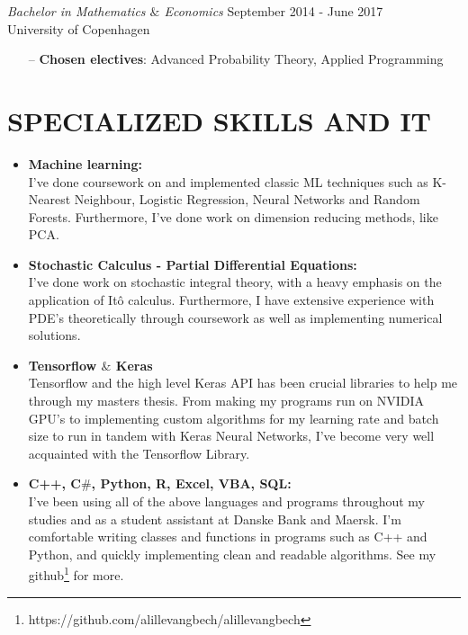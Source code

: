 \documentclass[margin, 10pt]{res} %
\begin{document}
\begin{resume}
{\sl Bachelor in Mathematics $\&$ Economics}  \hfill September 2014 - June 2017 \\
University of Copenhagen
\begin{itemize}
\item[--] \textbf{Chosen electives}: Advanced Probability Theory, Applied Programming
\end{itemize}


 

\section{SPECIALIZED SKILLS AND IT} 
\begin{itemize}
 \item \textbf{Machine learning:} \\
I've done coursework on and implemented classic ML techniques such as K-Nearest Neighbour, Logistic Regression, Neural Networks and Random Forests. Furthermore, I've done work on dimension reducing methods, like PCA.
 \item \textbf{{}Stochastic Calculus - Partial Differential Equations:} \\
 I've done work on stochastic integral theory, with a heavy emphasis on the application of Itô calculus. Furthermore, I have extensive experience with PDE's theoretically through coursework as well as implementing numerical solutions.
 \item \textbf{Tensorflow $\&$ Keras} \\
 Tensorflow and the high level Keras API has been crucial libraries to help me through my masters thesis.
 From making my programs run on NVIDIA GPU's to implementing custom algorithms for my learning rate and batch size to run in tandem with Keras Neural Networks, I've become very well acquainted with the Tensorflow Library.
 \item \textbf{C++, C$\#$, Python, R, Excel, VBA, SQL:} \\
 I've been using all of the above languages and programs throughout my studies and as a student assistant at Danske Bank and Maersk. I'm comfortable writing classes and functions in programs such as C++ and Python, and quickly implementing clean and readable algorithms. See my github\footnote{https://github.com/alillevangbech/alillevangbech} for more.
\end{itemize}




\end{resume}
\end{document}
